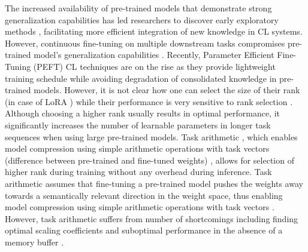 \documentclass[10pt]{article} %
\begin{document}
The increased availability of pre-trained models that demonstrate strong generalization capabilities has led researchers to discover early exploratory methods \citep{douillard2022dytox, jeeveswaran2023birt, gao2024consistent, yang2024generating}, facilitating more efficient integration of new knowledge in CL systems. However, continuous fine-tuning on multiple downstream tasks compromises pre-trained model's generalization capabilities \citep{liu2024parameter}. Recently, Parameter Efficient Fine-Tuning (PEFT) CL techniques \citep{liang2024inflora, zhou2024expandable} are on the rise as they provide lightweight training schedule while avoiding degradation of consolidated knowledge in pre-trained models. However, it is not clear how one can select the size of their rank (in case of LoRA \citep{hu2021lora}) while their performance is very sensitive to rank selection \citep{valipour2022dylora}. 
Although choosing a higher rank usually results in optimal performance, it significantly increases the number of learnable parameters in longer task sequences when using large pre-trained models.
 Task arithmetic \citep{ilharcoediting}, which enables model compression using simple arithmetic operations with task vectors (difference between pre-trained and fine-tuned weights) \citep{chitale2023task}, allows for selection of higher rank during training without any overhead during inference. 
Task arithmetic assumes that fine-tuning a pre-trained model pushes the weights away towards a semantically relevant direction in the weight space, thus enabling model compression using simple arithmetic operations with task vectors \citep{chitale2023task}. 
However, task arithmetic suffers from number of shortcomings including finding optimal scaling coefficients and suboptimal performance in the absence of a memory buffer \citep{zhou2024metagpt}. 
\end{document}

